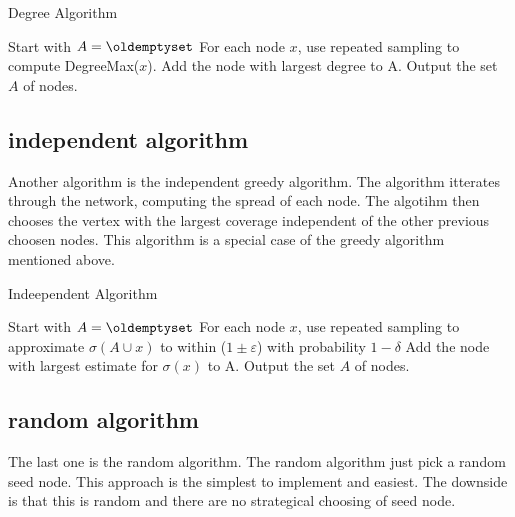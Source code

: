 {\begin{algorithm}
\caption{Degree Algorithm}
\begin{algorithmic}[1]
\State Start with $A = \oldemptyset$
\State For each node $x$, use repeated sampling to compute DegreeMax($x$).
\State Add the node with largest degree to A.
\EndWhile
\State Output the set $A$ of nodes.
\end{algorithmic}
\end{algorithm}

\subsection{independent algorithm}
Another algorithm is the independent greedy algorithm. The algorithm itterates through the network, computing the spread of each node. The algotihm then chooses the vertex with the largest coverage independent of the other previous choosen nodes. This algorithm is a special case of the greedy algorithm mentioned above.

\begin{algorithm}
\caption{Indeependent Algorithm}
\begin{algorithmic}[1]
\State Start with $A = \oldemptyset$
\State For each node $x$, use repeated sampling to approximate $\sigma(A \cup {x}) $ to within ($1 \pm \varepsilon$) with probability
$1 − \delta$
\State Add the node with largest estimate for $\sigma({x})$ to A.
\EndWhile
\State Output the set $A$ of nodes.
\end{algorithmic}
\end{algorithm}


\subsection{random algorithm}
The last one is the random algorithm. The random algorithm just pick a random seed node. This approach is the simplest to implement and easiest. The downside is that this is random and there are no strategical choosing of seed node. 

}
